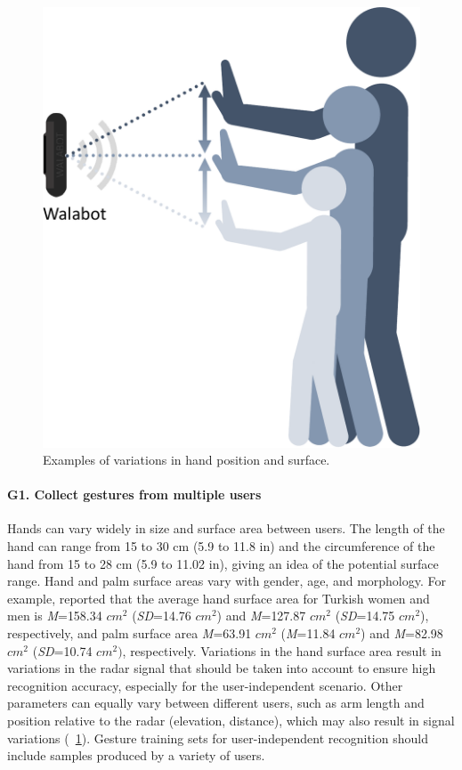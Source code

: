 \begin{figure}
    \centering
    \includegraphics[width=.4\linewidth]{Figures/RadarExperiments/Discussion/pipeline-limitations-size.pdf}
    \caption{Examples of variations in hand position and surface.}
    \label{fig:radar-experiments:discussion:elevation}
\end{figure}

\paragraph{G1. Collect gestures from multiple users}
Hands can vary widely in size and surface area between users. The length of the hand can range from 15 to 30 cm (5.9 to 11.8 in) and the circumference of the hand from 15 to 28 cm (5.9 to 11.02 in), giving an idea of the potential surface range. Hand and palm surface areas vary with gender, age, and morphology. For example, \cite{Goker:2017} reported that the average hand surface area for Turkish women and men is \textit{M}{=}158.34 $cm^2$ (\textit{SD}{=}14.76 $cm^2$) and \textit{M}{=}127.87 $cm^2$ (\textit{SD}{=}14.75 $cm^2$), respectively, and palm surface area \textit{M}{=}63.91 $cm^2$ (\textit{M}{=}11.84 $cm^2$) and \textit{M}{=}82.98 $cm^2$ (\textit{SD}{=}10.74 $cm^2)$, respectively. 
Variations in the hand surface area result in variations in the radar signal that should be taken into account to ensure high recognition accuracy, especially for the user-independent scenario. Other parameters can equally vary between different users, such as arm length and position relative to the radar (\eg elevation, distance), which may also result in signal variations (\fig~\ref{fig:radar-experiments:discussion:elevation}). Gesture training sets for user-independent recognition should include samples produced by a variety of users.

